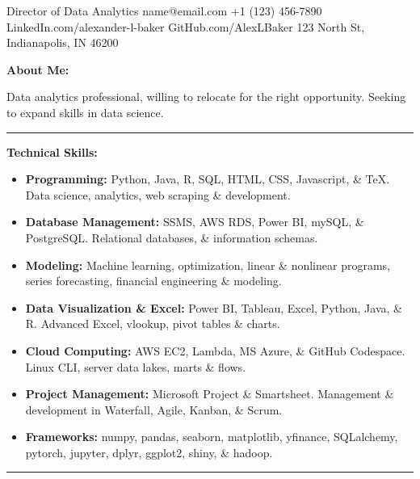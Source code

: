\documentclass[letterpaper]{cream_class}
\begin{document}
       {Director of Data Analytics}
       {name@email.com}
       {+1 (123) 456-7890}
       {LinkedIn.com/alexander-l-baker}
       {GitHub.com/AlexLBaker}
       {123 North St, Indianapolis, IN 46200}

\noindent\textcolor{burgundy}{\textbf{\large About Me:}}

Data analytics professional, willing to relocate for the right opportunity. Seeking to expand skills in data science.

\vspace{6pt}
\hrule
\vspace{6pt}

\noindent\textcolor{burgundy}{\textbf{\large Technical Skills:}}
\vspace{-6pt}
\begin{itemize}[noitemsep, leftmargin=*]
      \item \textbf{Programming:} Python, Java, R, SQL, HTML, CSS, Javascript, \& TeX. Data science, analytics, web scraping \& development.
      \item \textbf{Database Management:} SSMS, AWS RDS, Power BI, mySQL, \& PostgreSQL. Relational databases, \& information schemas.
      \item \textbf{Modeling:} Machine learning, optimization, linear \& nonlinear programs, series forecasting, financial engineering \& modeling.
      \item \textbf{Data Visualization \& Excel:} Power BI, Tableau, Excel, Python, Java, \& R. Advanced Excel, vlookup, pivot tables \& charts.
      \item \textbf{Cloud Computing:} AWS EC2, Lambda, MS Azure, \& GitHub Codespace. Linux CLI, server data lakes, marts \& flows.
      \item \textbf{Project Management:} Microsoft Project \& Smartsheet. Management \& development in Waterfall, Agile, Kanban, \& Scrum.
      \item \textbf{Frameworks:} numpy, pandas, seaborn, matplotlib, yfinance, SQLalchemy, pytorch, jupyter, dplyr, ggplot2, shiny, \& hadoop.
    \end{itemize}      
  \hrule
  \vspace{6pt}
  
\end{document}
